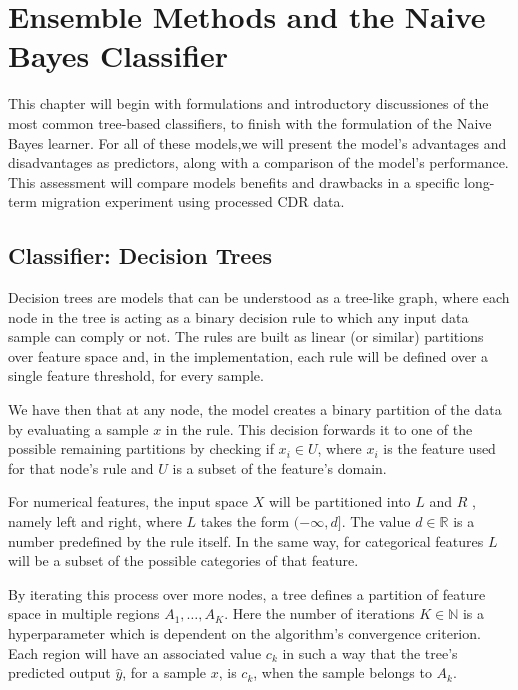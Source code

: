 \chapter{Ensemble Methods and the Naive Bayes Classifier}\label{ch:ensembleMethods}

This chapter will begin with formulations and introductory discussiones of the most common tree-based classifiers, to finish with the formulation of the Naive Bayes learner.
For all of these models,we will present the model's advantages and disadvantages as predictors, along with a comparison of the model's performance.
This assessment will compare models benefits and drawbacks in a specific long-term migration experiment using processed CDR data.

\section{Classifier: Decision Trees}\label{section:decision_trees}


Decision trees are models that can be understood as a tree-like graph, where each node in the tree is acting as a binary decision rule to which any input data sample can comply or not.
The rules are built as linear (or similar) partitions over feature space and, in the implementation, each rule will be defined over a single feature threshold, for every sample.

We have then that at any node, the model creates a binary partition of the data by evaluating a sample $x$ in the rule.
This decision forwards it to one of the possible remaining partitions by checking if $x_i \in U$, where $x_i$ is the feature used for that node's rule and $U$ is a subset of the feature's domain.

For numerical features, the input space $X$ will be partitioned into $L$ and $R$ , namely left and right, where $L$ takes the form $(-\infty,d]$. The value $d \in \mathbb{R}$ is a number predefined by the rule itself.
In the same way, for categorical features $L$ will be a subset of the possible categories of that feature.

By iterating this process over more nodes, a tree defines a partition of feature space in multiple regions $A_1,\ldots,A_K$.
Here the number of iterations $K \in \mathbb{N}$ is a hyperparameter which is dependent on the algorithm's convergence criterion.
Each region will have an associated value $c_k$ in such a way that the tree's predicted output $\hat{y}$, for a sample $x$, is $c_k$, when the sample belongs to $A_k$.

